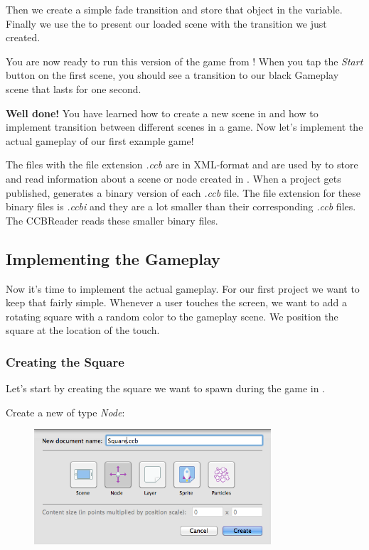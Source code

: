 Then we create a simple fade transition and store that object in
the  variable. Finally we use the  to present our loaded scene with the transition we just created.

You are now ready to run this version of the game from \xcode{}! When you tap
the \textit{Start} button on the first scene, you should see a transition to our
black Gameplay scene that lasts for one second.

\textbf{Well done!} You have learned how to create a new scene in \SB{} and how
to implement transition between different scenes in a game. Now let's implement
the actual gameplay of our first example game!

\begin{details} 
The files with the file extension \textit{.ccb} are in XML-format and are used
by \SB{} to store and read information about a scene or node created in \SB{}.
When a \SB{} project gets published, \SB{} generates a binary version of
each \textit{.ccb} file. The file extension for these binary files is
\textit{.ccbi} and they are a lot smaller than their corresponding
\textit{.ccb} files. The CCBReader reads these smaller binary files.
\end{details}

\subsection{Implementing the Gameplay}
Now it's time to implement the actual gameplay. For our first project we want to
keep that fairly simple. Whenever a user touches the screen, we want to add a
rotating square with a random color to the gameplay scene. We position the
square at the location of the touch. 

\subsubsection{Creating the Square \ccbfile{}}

Let's start by creating the square we want
to spawn during the game in \SB{}. 

\begin{leftbar}
Create a new \ccbfile{} of type
\textit{Node}: 
\begin{figure}[H]
		\centering
		\includegraphics[width=250pt]{images/firstproject/square_ccb.png}
\end{figure}
\end{leftbar}

